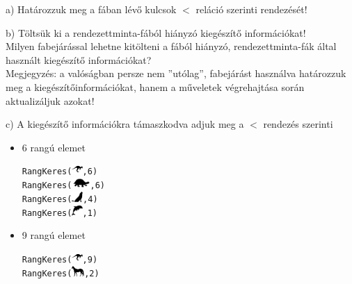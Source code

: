 \documentclass[12pt]{article}
\begin{document}
\begin{figure}[!h]
\end{figure}

\noindent a) Határozzuk meg a fában lévő kulcsok $<$ reláció szerinti rendezését!

\noindent b) Töltsük ki a rendezettminta-fából hiányzó kiegészítő információkat!\\
Milyen fabejárással lehetne kitölteni a fából hiányzó, rendezettminta-fák által használt kiegészítő információkat? \\
Megjegyzés: a valóságban persze nem ''utólag'', fabejárást használva határozzuk meg a kiegészítőinformációkat, hanem a műveletek végrehajtása során aktualizáljuk azokat!

\noindent c) A kiegészítő információkra támaszkodva adjuk meg a $<$ rendezés szerinti

\begin{itemize}
\item 6 rangú elemet
\begin{alltt}
RangKeres(\includegraphics[height=0.4cm]{kenguru.png}, 6)
RangKeres(\includegraphics[height=0.4cm]{turtle.png}, 6)
RangKeres(\includegraphics[height=0.4cm]{wolf.jpg}, 4)
RangKeres(\includegraphics[height=0.4cm]{delphin.jpg}, 1)
\end{alltt}

\item 9 rangú elemet
\begin{alltt}
RangKeres(\includegraphics[height=0.4cm]{kenguru.png}, 9)
RangKeres(\includegraphics[height=0.4cm]{horse.png}, 2)
\end{alltt}
\end{itemize}
\end{document}
